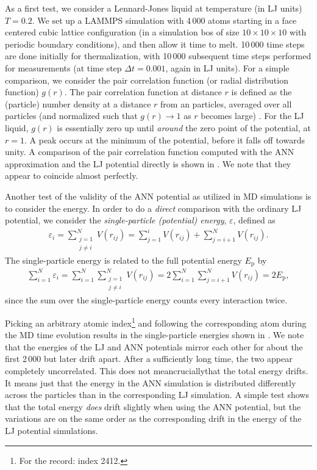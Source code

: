 \documentclass[../../master.tex]{subfiles}
\begin{document}
As a first test, we consider a Lennard-Jones liquid at temperature (in LJ units) $T=0.2$. We set up a LAMMPS simulation with 4\,000 atoms starting in a face centered cubic lattice configuration (in a simulation bos of size $10\times10\times10$ with periodic boundary conditions), and then allow it time to melt. 10\,000 time steps are done initially for thermalization, with 10\,000 subsequent time steps performed for measurements (at time step $\mathit{\Delta}t=0.001$, again in LJ units). For a simple comparison, we consider the pair correlation function (or radial distribution function) $g(r)$. The pair correlation function at distance $r$ is defined as the (particle) number density at a distance $r$ from an particles, averaged over all particles (and normalized such that $g(r)\rightarrow1$ as $r$ becomes large) \cite{frenkel}. For the LJ liquid, $g(r)$ is essentially zero up until \emph{around} the zero point of the potential, at $r=1$. A peak occurs at the minimum of the potential, before it falls off towards unity. A comparison of the pair correlation function computed with the ANN approximation and the LJ potential directly is shown in . We note that they appear to coincide almost perfectly. 

Another test of the validity of the ANN potential as utilized in MD simulations is to consider the energy. In order to do a \emph{direct} comparison with the ordinary LJ potential, we consider the \emph{single-particle (potential) energy}, $\varepsilon$, defined as 
\begin{align}
\varepsilon_i = \sum\limits_{\substack{j=1 \\ j\neq i}}^N V(r_{ij}) = \sum_{j=1}^i V(r_{ij}) + \sum_{j=i+1}^N V(r_{ij}). 
\end{align}
The single-particle energy is related to the full potential energy $E_\text{p}$ by 
\begin{align}
\sum_{i=1}^N\varepsilon_i = \sum_{i=1}^N\sum\limits_{\substack{j=1 \\ j\neq i}}^N V(r_{ij}) = 2\sum_{i=1}^N\sum_{j=i+1}^N V(r_{ij}) = 2E_\text{p},
\end{align}
since the sum over the single-particle energy counts every interaction twice.

Picking an arbitrary atomic index\footnote{For the record: index 2412.} and following the corresponding atom during the MD time evolution results in the single-particle energies shown in . We note that the energies of the LJ and ANN potentials mirror each other for about the first 2\,000 but later drift apart. After a sufficiently long time, the two appear completely uncorrelated. This does not mean\textemdash crucially\textemdash that the total energy drifts. It means just that the energy in the ANN simulation is distributed differently across the particles than in the corresponding LJ simulation. A simple test shows that the total energy \emph{does} drift slightly when using the ANN potential, but the variations are on the same order as the corresponding drift in the energy of the LJ potential simulations. 
\end{document}
